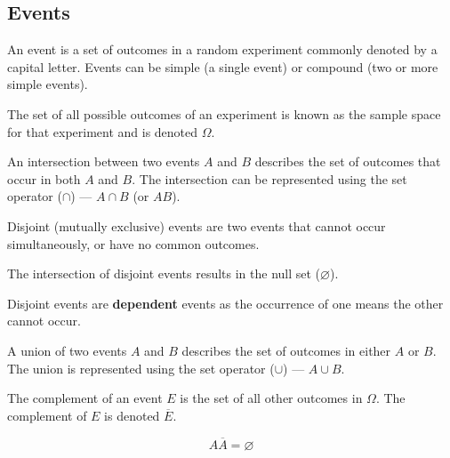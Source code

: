 \documentclass{article}
\begin{document}
\subsection{Events}
\begin{definition}[Event]
    An event is a set of outcomes in a random experiment commonly denoted by a capital letter.
    Events can be simple (a single event) or compound (two or more simple events).
\end{definition}
\begin{definition}
    The set of all possible outcomes of an experiment is known as the sample space
    for that experiment and is denoted \(\Omega\).
\end{definition}
\begin{definition}[Intersection]
    An intersection between two events \(A\) and \(B\) describes the set of outcomes that occur in both \(A\) and \(B\).
    The intersection can be represented using the set {} operator (\(\cap\)) --- \(A \cap B\) (or \(AB\)).
\end{definition}
\begin{definition}[Disjoint]
    Disjoint (mutually exclusive) events are two events that cannot occur simultaneously, or have no common outcomes.
\end{definition}
\begin{theorem}
    The intersection of disjoint events results in the null set (\(\varnothing\)).
\end{theorem}
\begin{lemma}
    Disjoint events are \textbf{dependent} events as the occurrence of one means the other cannot occur.
\end{lemma}
\begin{definition}[Union]
    A union of two events \(A\) and \(B\) describes the set of outcomes in either \(A\) or \(B\).
    The union is represented using the set {} operator (\(\cup\)) --- \(A \cup B\).
\end{definition}
\begin{definition}[Complement]
    The complement of an event \(E\) is the set of all other outcomes in \(\Omega\).
    The complement of \(E\) is denoted \(\overline{E}\).
\end{definition}
\begin{theorem}
    \begin{equation*}
        A\overline{A} = \varnothing
    \end{equation*}
\end{theorem}
\end{document}
